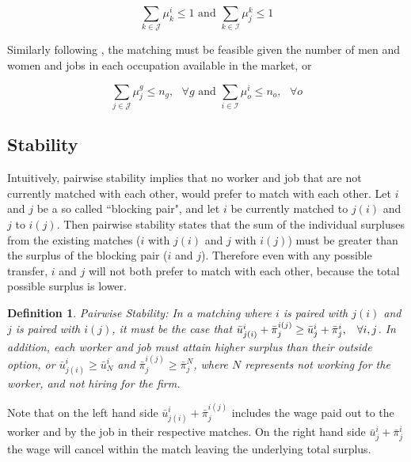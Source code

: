\documentclass[11pt]{article}
\newtheorem{definition}{Definition}
\begin{document}
$$ \sum_{k \in \mathcal{J}} \mu^i_k \leq 1 \text{ and }  \sum_{k \in \mathcal{I}} \mu^k_j \leq 1$$

Similarly following , the matching must be feasible given the number of men and women and jobs in each occupation available in the market, or

$$ \sum_{j \in \mathcal{J}} \mu^g_j \leq n_g, \text{ } \forall g \text{ and }  \sum_{i \in \mathcal{I}} \mu^i_o \leq n_o, \text{ } \forall o$$

\subsection{Stability}

Intuitively, pairwise stability implies that no worker and job that are not currently matched with each other, would prefer to match with each other. Let $i$ and $j$ be a so called ``blocking pair", and let $i$ be currently matched to $j(i)$ and $j$ to $i(j)$. Then pairwise stability states that the sum of the individual surpluses from the existing matches ($i$ with $j(i)$ and $j$ with $i(j)$) must be greater than the surplus of the blocking pair ($i$ and $j$). Therefore even with any possible transfer, $i$ and $j$ will not both prefer to match with each other, because the total possible surplus is lower.

\begin{definition}
Pairwise Stability: In a matching where $i$ is paired with $j(i)$ and $j$ is paired with $i(j)$, it must be the case that $\bar{u}^{i}_{j(i)}+ \bar{\pi}^{i(j)}_j \geq \bar{u}^{i}_{j} + \bar{\pi}^{i}_j, \hspace{3mm}  \forall i,j$. In addition, each worker and job must attain higher surplus than their outside option, or $\bar{u}^{i}_{j(i)} \geq \bar{u}^{i}_{N}$ and $\bar{\pi}^{i(j)}_j \geq \bar{\pi}^{N}_j $, where $N$ represents not working for the worker, and not hiring for the firm.
 \end{definition}
 
Note that on the left hand side $\bar{u}^{i}_{j(i)}+ \bar{\pi}^{i(j)}_j$ includes the wage paid out to the worker and by the job in their respective matches. On the right hand side $\bar{u}^{i}_{j} + \bar{\pi}^{i}_j$ the wage will cancel within the match leaving the underlying total surplus. 
\end{document}
